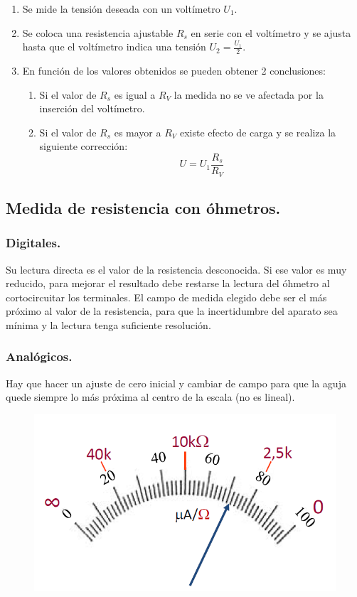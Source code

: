 \begin{enumerate}
	\item Se mide la tensión deseada con un voltímetro $U_1$.
	\item Se coloca una resistencia ajustable $R_s$ en serie con el voltímetro y se ajusta hasta que el voltímetro indica una tensión $U_2=\frac{U_1}{2}$.
	\item En función de los valores obtenidos se pueden obtener 2 conclusiones:
	\begin{enumerate}
		\item Si el valor de $R_s$ es igual a $R_V$ la medida no se ve afectada por la inserción del voltímetro.
		\item Si el valor de $R_s$ es mayor a $R_V$ existe efecto de carga y se realiza la siguiente corrección:
		\[U=U_1\frac{R_s}{R_V}\]   
	\end{enumerate}
\end{enumerate}


\subsection{Medida de resistencia con óhmetros.}
\subsubsection{Digitales.}
Su lectura directa es el valor de la resistencia desconocida. Si ese valor es muy reducido, para mejorar el resultado debe restarse la lectura del óhmetro al cortocircuitar los terminales.  El campo de medida elegido debe ser el más próximo al
valor de la resistencia, para que la incertidumbre del
aparato sea mínima y la lectura tenga suficiente resolución.
\subsubsection{Analógicos.}
Hay que hacer un ajuste de cero inicial y cambiar de campo
para que la aguja quede siempre lo más próxima al centro
de la escala (no es lineal).
\begin{figure}[H]
	\centering
	\includegraphics[width=0.5\linewidth]{ImagenesTema4/3}
	\label{fig:3}
\end{figure}



